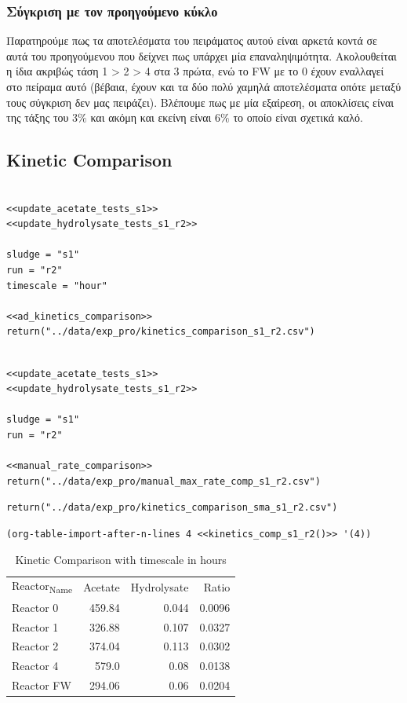 \documentclass[11pt]{article}
\begin{document}
\subsubsection{Σύγκριση με τον προηγούμενο κύκλο}
\label{sec:org622e2af}
Παρατηρούμε πως τα αποτελέσματα του πειράματος αυτού είναι αρκετά κοντά σε αυτά του προηγούμενου που δείχνει πως υπάρχει μία επαναληψιμότητα. Ακολουθείται η ίδια ακριβώς τάση 1 > 2 > 4 στα 3 πρώτα, ενώ το FW με το 0 έχουν εναλλαγεί στο πείραμα αυτό (βέβαια, έχουν και τα δύο πολύ χαμηλά αποτελέσματα οπότε μεταξύ τους σύγκριση δεν μας πειράζει). Βλέπουμε πως με μία εξαίρεση, οι αποκλίσεις είναι της τάξης του \(3 \%\) και ακόμη και εκείνη είναι \(6 \%\) το οποίο είναι σχετικά καλό. 

\subsection{Kinetic Comparison}
\label{sec:org3b6b92f}
\begin{verbatim}

<<update_acetate_tests_s1>>
<<update_hydrolysate_tests_s1_r2>>

sludge = "s1"
run = "r2"
timescale = "hour"

<<ad_kinetics_comparison>>
return("../data/exp_pro/kinetics_comparison_s1_r2.csv")
\end{verbatim}

\begin{verbatim}

<<update_acetate_tests_s1>>
<<update_hydrolysate_tests_s1_r2>>

sludge = "s1"
run = "r2"

<<manual_rate_comparison>>
return("../data/exp_pro/manual_max_rate_comp_s1_r2.csv")

\end{verbatim}

\begin{verbatim}
return("../data/exp_pro/kinetics_comparison_sma_s1_r2.csv")
\end{verbatim}

\begin{verbatim}
(org-table-import-after-n-lines 4 <<kinetics_comp_s1_r2()>> '(4))
\end{verbatim}

\begin{table}[htbp]
\caption{Kinetic Comparison with timescale in hours}
\centering
\begin{tabular}{lrrr}
Reactor\textsubscript{Name} & Acetate & Hydrolysate & Ratio\\[0pt]
Reactor 0 & 459.84 & 0.044 & 0.0096\\[0pt]
Reactor 1 & 326.88 & 0.107 & 0.0327\\[0pt]
Reactor 2 & 374.04 & 0.113 & 0.0302\\[0pt]
Reactor 4 & 579.0 & 0.08 & 0.0138\\[0pt]
Reactor FW & 294.06 & 0.06 & 0.0204\\[0pt]
\end{tabular}
\end{table}
\end{document}
